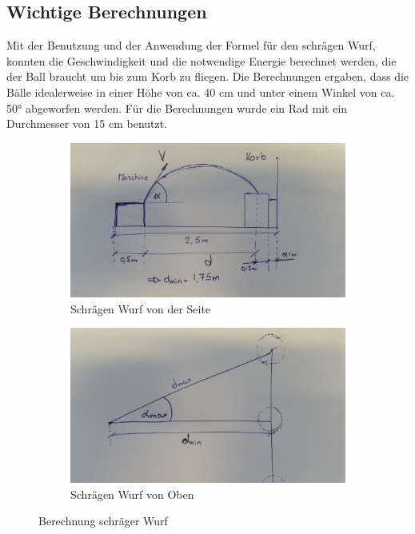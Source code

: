 \subsection{Wichtige Berechnungen}
Mit der Benutzung und der Anwendung der Formel für den schrägen Wurf, konnten die Geschwindigkeit und die notwendige Energie berechnet werden, 
die der Ball braucht um bis zum Korb zu fliegen. Die Berechnungen ergaben, dass die Bälle idealerweise in einer Höhe von ca. 40 cm und unter einem Winkel von ca. 50° abgeworfen werden. Für die Berechnungen wurde ein Rad mit ein Durchmesser von 15 cm benutzt. \\

\begin{figure}[h!]
	\begin{subfigure}{.5\textwidth}
		\includegraphics[width=1\textwidth]{../../fig/Skizze_Berechnung_1.jpg}
		\caption{Schrägen Wurf von der Seite}
		\label{fig:Berechnungen von die Geschwindigkeit}
	\end{subfigure} %
	\begin{subfigure}{.5\textwidth}
		\includegraphics[width=1\textwidth]{../../fig/Skizze_Berechnung_2.jpg}
		\caption{Schrägen Wurf von Oben}
		\label{fig:Berechnungen von die Geschwindigkeit}
	\end{subfigure}
	\caption{Berechnung schräger Wurf}
	\label{Berechnungen}
\end{figure}

